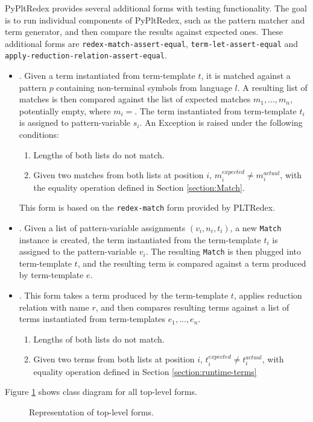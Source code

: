 PyPltRedex provides several additional forms with testing functionality. The goal is to run individual components of PyPltRedex, such as the pattern matcher and term generator, and then compare the results against expected ones. These additional forms are \texttt{redex-match-assert-equal}, \texttt{term-let-assert-equal} and \\ \texttt{apply-reduction-relation-assert-equal}.

\begin{itemize}
\item \RedexMatchAssertEqual. Given a term instantiated from term-template $t$, it is matched against a pattern $p$ containing non-terminal symbols from language $l$. A resulting list of matches is then compared against the list of expected matches $m_1,...,m_n$, potentially empty, where $m_i=$\space\Match. The term instantiated from term-template $t_i$ is assigned to pattern-variable $s_i$. An Exception is raised under the following conditions:
	\begin{enumerate}
	\item Lengths of both lists do not match.
	\item Given two matches from both lists at position $i$, $m_i^{expected} \neq m_i^{actual}$, with the equality operation defined in Section \ref{section:Match}.
	\end{enumerate}
	This form is based on the \texttt{redex-match} form provided by PLTRedex.

\item \TermLetAssertEqual. Given a list of pattern-variable assignments $(v_i, n_i, t_i)$, a new \texttt{Match} instance is created, the term instantiated from the term-template $t_i$ is assigned to the pattern-variable $v_i$. The resulting \texttt{Match} is then plugged into term-template $t$, and the resulting term is compared against a term produced by term-template $e$.

\item \ApplyReductionRelationAssertEqual. This form takes a term produced by the term-template $t$, applies reduction relation with name $r$, and then compares resulting terms against a list of terms instantiated from term-templates $e_1,...,e_n$.
	\begin{enumerate}
	\item Lengths of both lists do not match.
	\item Given two terms from both lists at position $i$, $t_i^{expected} \neq t_i^{actual}$, with equality operation defined in Section \ref{section:runtime-terms}
	\end{enumerate}
\end{itemize}

Figure \ref{class-diagram-toplevel} shows class diagram for all top-level forms.

\begin{figure}[htb]
	\centering
	\caption{Representation of top-level forms.}
\label{class-diagram-toplevel}
\end{figure}
